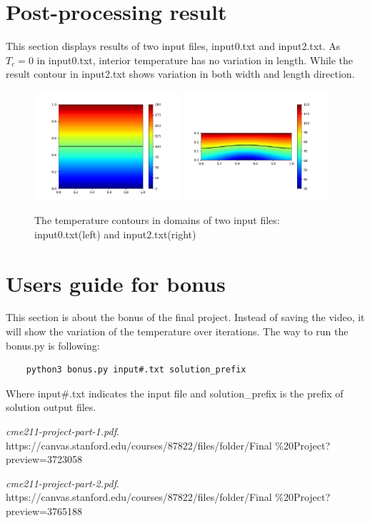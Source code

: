 \documentclass{article}
\begin{document}
\section*{Post-processing result}
This section displays results of two input files, input0.txt and input2.txt.
As $T_c=0$ in input0.txt, interior temperature has no variation in length. 
While the result contour in input2.txt shows variation
 in both width and length direction.
\begin{figure}[h!]
\centering
\includegraphics[width=0.48\textwidth]{result0.jpg}
\includegraphics[width=0.48\textwidth]{result2.jpg}
\caption{\label{fig:result} The temperature contours
 in domains of two input files:
input0.txt(left) and input2.txt(right)}
\end{figure}


\section*{Users guide for bonus}
This section is about the bonus of the final project.
Instead of saving the video, it will show the variation of the temperature over iterations.
The way to run the bonus.py is following:

\begin{verbatim}
    python3 bonus.py input#.txt solution_prefix
\end{verbatim}
Where input\#.txt indicates the input file and
 solution\_prefix is the prefix of solution output files.

\begin{thebibliography}{999}
    \emph{cme211-project-part-1.pdf}. \\
    https://canvas.stanford.edu/courses/87822/files/folder/Final
    \%20Project?preview=3723058

    \emph{cme211-project-part-2.pdf}. \\
    https://canvas.stanford.edu/courses/87822/files/folder/Final
    \%20Project?preview=3765188

\end{thebibliography}
\end{document}
